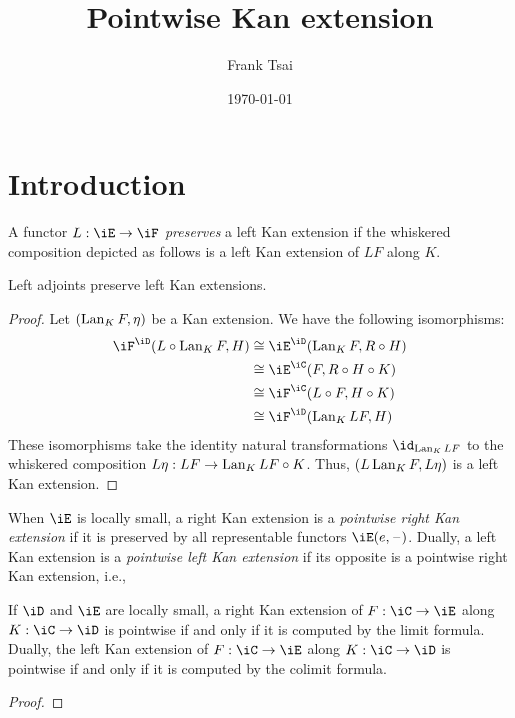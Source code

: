 \documentclass{amsart}
\title{Pointwise Kan extension}
\author{Frank Tsai}
\date{\today}
\begin{document}
\maketitle
\tableofcontents

\section{Introduction}
\label{sec:introduction}

\begin{defn}
  A functor $L : \iE \to \iF$ \emph{preserves} a left Kan extension if the whiskered composition depicted as follows is a left Kan extension of $LF$ along $K$.
  \[\]
\end{defn}

\begin{lem}
  Left adjoints preserve left Kan extensions.
\end{lem}
\begin{proof}
  Let $(\operatorname{Lan}_{K}F, \eta)$ be a Kan extension.
  We have the following isomorphisms:
  \begin{align}
    \iF^{\iD}(L \circ \lan_{K}F, H) &\iso \iE^{\iD}(\lan_{K}F, R \circ H)\\
                                &\iso \iE^{\iC}(F, R \circ H \circ K)\\
                                &\iso \iF^{\iC}(L \circ F, H \circ K)\\
                                &\iso \iF^{\iD}(\lan_{K} LF, H)
  \end{align}
  These isomorphisms take the identity natural transformations $\id_{\lan_{K}LF}$ to the whiskered composition $L\eta : LF \to \operatorname{Lan}_{K}LF \circ K$.
  Thus, $(L\operatorname{Lan}_{K}F, L\eta)$ is a left Kan extension.
\end{proof}

\begin{defn}
  When $\iE$ is locally small, a right Kan extension is a \emph{pointwise right Kan extension} if it is preserved by all representable functors $\iE(e,\blank)$.
  Dually, a left Kan extension is a \emph{pointwise left Kan extension} if its opposite is a pointwise right Kan extension, i.e.,
  \[\]
\end{defn}

\begin{thm}
  If $\iD$ and $\iE$ are locally small, a right Kan extension of $F : \iC \to \iE$ along $K : \iC \to \iD$ is pointwise if and only if it is computed by the limit formula.
  Dually, the left Kan extension of $F : \iC \to \iE$ along $K : \iC \to \iD$ is pointwise if and only if it is computed by the colimit formula.
\end{thm}
\begin{proof}
  
\end{proof}



\end{document}
